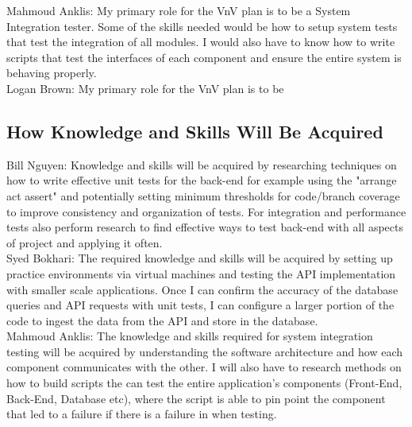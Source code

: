 \documentclass[12pt, titlepage]{article}
\begin{document}
\noindent Mahmoud Anklis: My primary role for the VnV plan is to be a System Integration tester. Some of the skills needed would be how to setup system tests that test the integration of all modules. I would also have to know how to write scripts that test the interfaces of each component and ensure the entire system is behaving properly.\\

\noindent Logan Brown: My primary role for the VnV plan is to be 

\subsection{How Knowledge and Skills Will Be Acquired}

\noindent Bill Nguyen: Knowledge and skills will be acquired by researching techniques on how to write effective unit tests for the back-end for example using the "arrange act assert" and potentially setting minimum thresholds for code/branch coverage to improve consistency and organization of tests. For integration and performance tests also perform research to find effective ways to test back-end with all aspects of project and applying it often.\\

\noindent Syed Bokhari: The required knowledge and skills will be acquired by setting up practice environments via virtual machines and testing the API implementation with smaller scale applications. Once I can confirm the accuracy of the database queries and API requests with unit tests, I can configure a larger portion of the code to ingest the data from the API and store in the database.\\

\noindent Mahmoud Anklis: The  knowledge and skills required for system integration testing will be acquired by understanding the software architecture and how each component communicates with the other. I will also have to research methods on how to build scripts the can test the entire application's components (Front-End, Back-End, Database etc), where the script is able to pin point the component that led to a failure if there is a failure in when testing.\\
\end{document}
